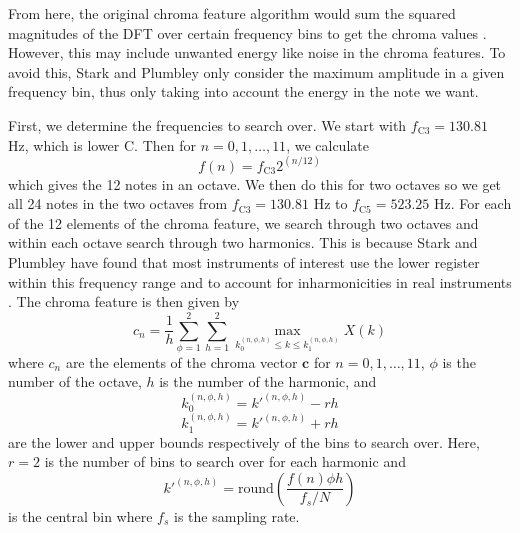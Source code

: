 \documentclass[journal]{IEEEtran}
\begin{document}
From here, the original chroma feature algorithm would sum the squared magnitudes of the DFT over certain frequency bins to get the chroma values \cite{fujishima}.
However, this may include unwanted energy like noise in the chroma features.
To avoid this, Stark and Plumbley only consider the maximum amplitude in a given frequency bin, thus only taking into account the energy in the note we want.

First, we determine the frequencies to search over.
We start with $f_{\text{C}3} = 130.81$ Hz, which is lower C.
Then for $n = 0, 1, \ldots, 11$, we calculate
\begin{equation}
    f(n) = f_{\text{C}3}2^{(n / 12)}
    \label{eq:freq}
\end{equation}
which gives the 12 notes in an octave.
We then do this for two octaves so we get all 24 notes in the two octaves from $f_{\text{C}3} = 130.81$ Hz to $f_{\text{C}5} = 523.25$ Hz.
For each of the 12 elements of the chroma feature, we search through two octaves and within each octave search through two harmonics.
This is because Stark and Plumbley have found that most instruments of interest use the lower register within this frequency range and to account for inharmonicities in real instruments \cite{stark}.
The chroma feature is then given by
\begin{equation}
    c_n = \frac{1}{h}\sum_{\phi = 1}^2\sum_{h = 1}^2 \max_{k_0^{(n, \phi, h)} \leq k \leq k_1^{(n, \phi, h)}} X(k)
    \label{eq:chroma}
\end{equation}
where $c_n$ are the elements of the chroma vector $\mathbf{c}$ for $n = 0, 1, \ldots, 11$, $\phi$ is the number of the octave, $h$ is the number of the harmonic, and 
\begin{equation*}
    k_0^{(n, \phi, h)} = k'^{(n, \phi, h)} - rh
\end{equation*}
\begin{equation*}
    k_1^{(n, \phi, h)} = k'^{(n, \phi, h)} + rh
\end{equation*}
are the lower and upper bounds respectively of the bins to search over. Here, $r = 2$ is the number of bins to search over for each harmonic and 
\begin{equation*}
    k'^{(n, \phi, h)} = \text{round}\!\left(\frac{f(n)\phi h}{f_s / N}\right)
\end{equation*}
is the central bin where $f_s$ is the sampling rate.
\end{document}
